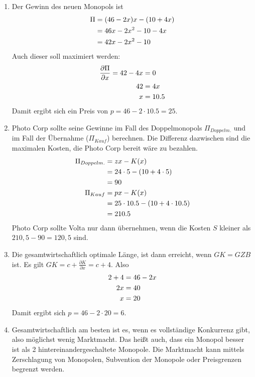 \documentclass{article}
\begin{document}
\begin{enumerate}[label=(\alph*)]
		\item Der Gewinn des neuen Monopols ist
		\begin{align}
			\Pi &= (46-2x)x - (10+4x) \notag \\
			&= 46x-2x^2-10-4x \notag \\
			&= 42x-2x^2-10 \notag
		\end{align}
		Auch dieser soll maximiert werden:
		\begin{align}
			\frac{\partial\Pi}{\partial x} = 42-4x&=0 \notag \\
			42 &= 4x \notag \\
			x &= 10.5 \notag
		\end{align}
		Damit ergibt sich ein Preis von $p=46-2\cdot 10.5= 25$.
		\item Photo Corp sollte seine Gewinne im Fall des Doppelmonopols $\Pi_{Doppelm.}$ und im Fall der Übernahme ($\Pi_{Kauf}$) berechnen. Die Differenz dazwischen sind die maximalen Kosten, die Photo Corp bereit wäre zu bezahlen.
		\begin{align}
			\Pi_{Doppelm.} &= zx - K(x) \notag \\
			&= 24\cdot 5 - (10+4\cdot 5) \notag \\
			&= 90 \notag \\
			\Pi_{Kauf} &= px - K(x) \notag \\
			&= 25\cdot 10.5 - (10+4\cdot 10.5) \notag \\
			&= 210.5 \notag
		\end{align}
		Photo Corp sollte Volta nur dann übernehmen, wenn die Kosten $S$ kleiner als $210,5-90=120,5$ sind.
		\item Die gesamtwirtschaftlich optimale Länge, ist dann erreicht, wenn $GK=GZB$ ist. Es gilt $GK = c + \frac{\partial K}{\partial x} = c + 4$. Also
		\begin{align}
			2+4 &= 46-2x \notag \\
			2x &= 40 \notag \\
			x &= 20 \notag
		\end{align}
		Damit ergibt sich $p=46-2\cdot 20=6$.
		\item Gesamtwirtschaftlich am besten ist es, wenn es vollständige Konkurrenz gibt, also möglichst wenig Marktmacht. Das heißt auch, dass ein Monopol besser ist als 2 hintereinandergeschaltete Monopole. Die Marktmacht kann mittels Zerschlagung von Monopolen, Subvention der Monopole oder Preisgrenzen begrenzt werden.
	\end{enumerate}
\end{document}
